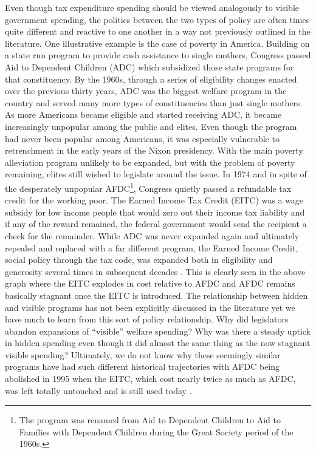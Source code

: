 \documentclass[12pt]{article}
\begin{document}
Even though tax expenditure spending should be viewed analogously to visible government spending, the politics between the two types of policy are often times quite different and reactive to one another in a way not previously outlined in the literature. One illustrative example is the case of poverty in America. Building on a state run program to provide cash assistance to single mothers, Congress passed Aid to Dependent Children (ADC) which subsidized those state programs for that constituency. By the 1960s, through a series of eligibility changes enacted over the previous thirty years, ADC was the biggest welfare program in the country and served many more types of constituencies than just single mothers. As more Americans became eligible and started receiving ADC, it became increasingly unpopular among the public and elites. Even though the program had never been popular among Americans, it was especially vulnerable to retrenchment in the early years of the Nixon presidency. With the main poverty alleviation program unlikely to be expanded, but with the problem of poverty remaining, elites still wished to legislate around the issue. In 1974 and in spite of the desperately unpopular AFDC\footnote{The program was renamed from Aid to Dependent Children to Aid to Families with Dependent Children during the Great Society period of the 1960s.}, Congress quietly passed a refundable tax credit for the working poor. The Earned Income Tax Credit (EITC) was a wage subsidy for low income people that would zero out their income tax liability and if any of the reward remained, the federal government would send the recipient a check for the remainder. While ADC was never expanded again and ultimately repealed and replaced with a far different program, the Earned Income Credit, social policy through the tax code, was expanded both in eligibility and generosity several times in subsequent decades \citep{stewart1991}. This is clearly seen in the above graph where the EITC explodes in cost relative to AFDC and AFDC remains basically stagnant once the EITC is introduced. The relationship between hidden and visible programs has not been  explicitly discussed in the literature yet we have much to learn from this sort of policy relationship. Why did legislators abandon expansions of ``visible'' welfare spending? Why was there a steady uptick in hidden spending even though it did almost the same thing as the now stagnant visible spending? Ultimately, we do not know why these seemingly similar programs have had such different historical trajectories with AFDC being abolished in 1995 when the EITC, which cost nearly twice as much as AFDC, was left totally untouched and is still used today \citep{myles1997}.
\end{document}
